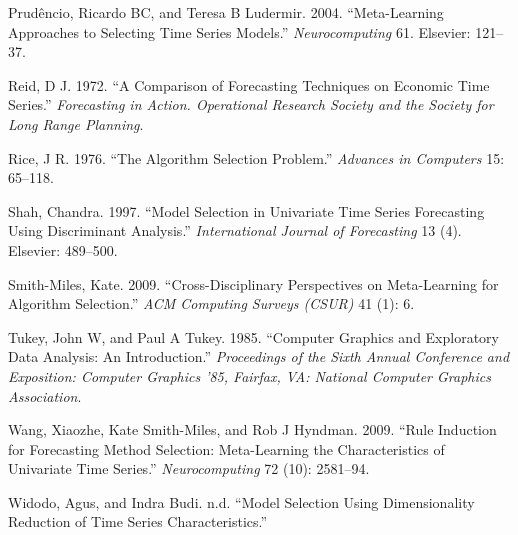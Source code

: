 \documentclass[11pt,]{article}
\theoremstyle{definition}
\theoremstyle{definition}
\theoremstyle{definition}
\theoremstyle{remark}
\begin{document}
\hypertarget{ref-prudencio2004meta}{}
Prudêncio, Ricardo BC, and Teresa B Ludermir. 2004. ``Meta-Learning
Approaches to Selecting Time Series Models.'' \emph{Neurocomputing} 61.
Elsevier: 121--37.

\hypertarget{ref-reid1972comparison}{}
Reid, D J. 1972. ``A Comparison of Forecasting Techniques on Economic
Time Series.'' \emph{Forecasting in Action. Operational Research Society
and the Society for Long Range Planning}.

\hypertarget{ref-rice1976}{}
Rice, J R. 1976. ``The Algorithm Selection Problem.'' \emph{Advances in
Computers} 15: 65--118.

\hypertarget{ref-shah1997model}{}
Shah, Chandra. 1997. ``Model Selection in Univariate Time Series
Forecasting Using Discriminant Analysis.'' \emph{International Journal
of Forecasting} 13 (4). Elsevier: 489--500.

\hypertarget{ref-smith2009cross}{}
Smith-Miles, Kate. 2009. ``Cross-Disciplinary Perspectives on
Meta-Learning for Algorithm Selection.'' \emph{ACM Computing Surveys
(CSUR)} 41 (1): 6.

\hypertarget{ref-tukey1988computer}{}
Tukey, John W, and Paul A Tukey. 1985. ``Computer Graphics and
Exploratory Data Analysis: An Introduction.'' \emph{Proceedings of the
Sixth Annual Conference and Exposition: Computer Graphics '85, Fairfax,
VA: National Computer Graphics Association}.

\hypertarget{ref-wang2009rule}{}
Wang, Xiaozhe, Kate Smith-Miles, and Rob J Hyndman. 2009. ``Rule
Induction for Forecasting Method Selection: Meta-Learning the
Characteristics of Univariate Time Series.'' \emph{Neurocomputing} 72
(10): 2581--94.

\hypertarget{ref-widodomodel}{}
Widodo, Agus, and Indra Budi. n.d. ``Model Selection Using
Dimensionality Reduction of Time Series Characteristics.''
\end{document}
